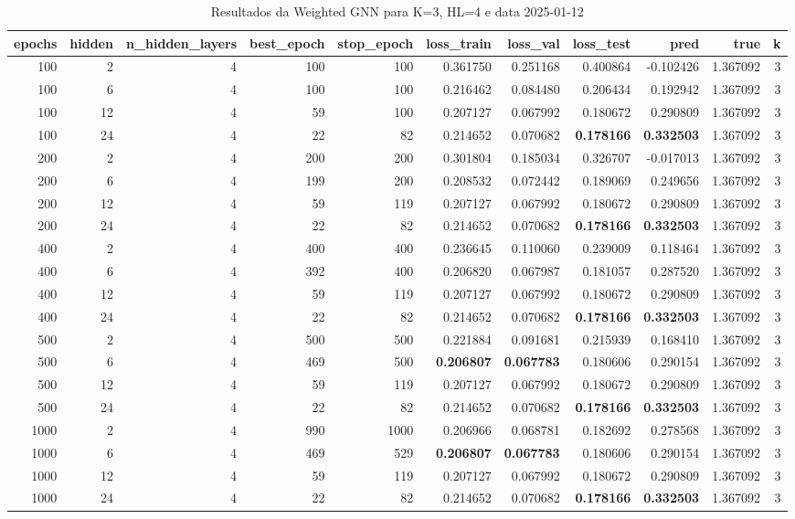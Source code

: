 \begin{table}
\caption{Resultados da Weighted GNN para K=3, HL=4 e data 2025-01-12}
\label{tab:weighted_gnn_results_k3_hl4_d20250112}
\begin{tabular}{rrrrrrrrrrr}
\toprule
epochs & hidden & n\_hidden\_layers & best\_epoch & stop\_epoch & loss\_train & loss\_val & loss\_test & pred & true & k \\
\midrule
100 & 2 & 4 & 100 & 100 & 0.361750 & 0.251168 & 0.400864 & -0.102426 & 1.367092 & 3 \\
100 & 6 & 4 & 100 & 100 & 0.216462 & 0.084480 & 0.206434 & 0.192942 & 1.367092 & 3 \\
100 & 12 & 4 & 59 & 100 & 0.207127 & 0.067992 & 0.180672 & 0.290809 & 1.367092 & 3 \\
100 & 24 & 4 & 22 & 82 & 0.214652 & 0.070682 & \textbf{0.178166} & \textbf{0.332503} & 1.367092 & 3 \\
200 & 2 & 4 & 200 & 200 & 0.301804 & 0.185034 & 0.326707 & -0.017013 & 1.367092 & 3 \\
200 & 6 & 4 & 199 & 200 & 0.208532 & 0.072442 & 0.189069 & 0.249656 & 1.367092 & 3 \\
200 & 12 & 4 & 59 & 119 & 0.207127 & 0.067992 & 0.180672 & 0.290809 & 1.367092 & 3 \\
200 & 24 & 4 & 22 & 82 & 0.214652 & 0.070682 & \textbf{0.178166} & \textbf{0.332503} & 1.367092 & 3 \\
400 & 2 & 4 & 400 & 400 & 0.236645 & 0.110060 & 0.239009 & 0.118464 & 1.367092 & 3 \\
400 & 6 & 4 & 392 & 400 & 0.206820 & 0.067987 & 0.181057 & 0.287520 & 1.367092 & 3 \\
400 & 12 & 4 & 59 & 119 & 0.207127 & 0.067992 & 0.180672 & 0.290809 & 1.367092 & 3 \\
400 & 24 & 4 & 22 & 82 & 0.214652 & 0.070682 & \textbf{0.178166} & \textbf{0.332503} & 1.367092 & 3 \\
500 & 2 & 4 & 500 & 500 & 0.221884 & 0.091681 & 0.215939 & 0.168410 & 1.367092 & 3 \\
500 & 6 & 4 & 469 & 500 & \textbf{0.206807} & \textbf{0.067783} & 0.180606 & 0.290154 & 1.367092 & 3 \\
500 & 12 & 4 & 59 & 119 & 0.207127 & 0.067992 & 0.180672 & 0.290809 & 1.367092 & 3 \\
500 & 24 & 4 & 22 & 82 & 0.214652 & 0.070682 & \textbf{0.178166} & \textbf{0.332503} & 1.367092 & 3 \\
1000 & 2 & 4 & 990 & 1000 & 0.206966 & 0.068781 & 0.182692 & 0.278568 & 1.367092 & 3 \\
1000 & 6 & 4 & 469 & 529 & \textbf{0.206807} & \textbf{0.067783} & 0.180606 & 0.290154 & 1.367092 & 3 \\
1000 & 12 & 4 & 59 & 119 & 0.207127 & 0.067992 & 0.180672 & 0.290809 & 1.367092 & 3 \\
1000 & 24 & 4 & 22 & 82 & 0.214652 & 0.070682 & \textbf{0.178166} & \textbf{0.332503} & 1.367092 & 3 \\
\bottomrule
\end{tabular}
\end{table}

